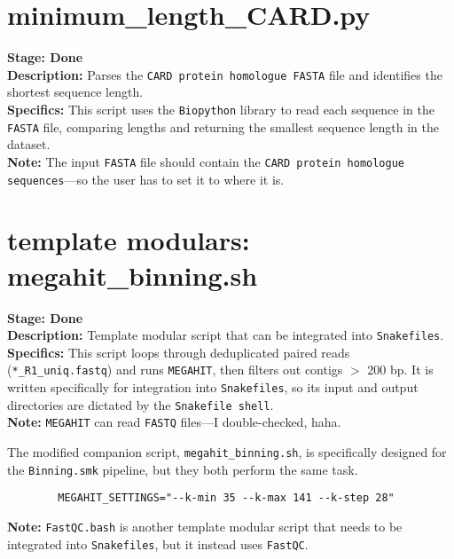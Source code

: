 \documentclass[11pt]{report}
\begin{document}
{\linenumbers*
\section{minimum\_length\_CARD.py}
\textbf{Stage: Done} \\   
\textbf{Description:} Parses the \texttt{CARD protein homologue FASTA} file and identifies the shortest sequence length. \\
\textbf{Specifics:} This script uses the \texttt{Biopython} library to read each sequence in the \texttt{FASTA} file, comparing lengths and returning the smallest sequence length in the dataset. \\
\textbf{Note:} The input \texttt{FASTA} file should contain the \texttt{CARD protein homologue sequences}—so the user has to set it to where it is.


\linenumbers*
\section{template modulars: megahit\_binning.sh} 
\textbf{Stage: Done} \\   
\textbf{Description:} Template modular script that can be integrated into \texttt{Snakefiles}. \\
\textbf{Specifics:} This script loops through deduplicated paired reads (\texttt{*\_R1\_uniq.fastq}) and runs \texttt{MEGAHIT}, then filters out contigs $>$ 200 bp. It is written specifically for integration into \texttt{Snakefiles}, so its input and output directories are dictated by the \texttt{Snakefile shell}. \\
\textbf{Note:} \texttt{MEGAHIT} can read \texttt{FASTQ} files—I double-checked, haha. \\

\begin{tcolorbox}
	The modified companion script, \texttt{megahit\_binning.sh}, is specifically designed for the \texttt{Binning.smk} pipeline, but they both perform the same task.  
	\begin{verbatim}
		MEGAHIT_SETTINGS="--k-min 35 --k-max 141 --k-step 28"
	\end{verbatim} 
	\textbf{Note:} \texttt{FastQC.bash} is another template modular script that needs to be integrated into \texttt{Snakefiles}, but it instead uses \texttt{FastQC}.
\end{tcolorbox}

\linenumbers*
}
\end{document}

